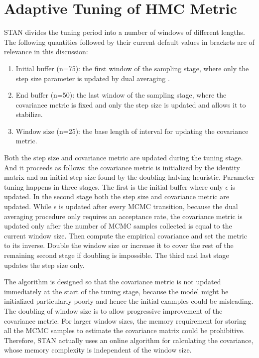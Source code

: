 \documentclass[]{report}
\begin{document}
\section{Adaptive Tuning of HMC Metric}
STAN divides the tuning period into a number of windows of different lengths. The following quantities followed by their current default values in brackets are of relevance in this discussion: 

\begin{enumerate}
\item Initial buffer (n=75): the first window of the sampling stage, where only the step size parameter is updated by dual averaging .

\item End buffer (n=50): the last window of the sampling stage, where the covariance metric is fixed and only the step size is updated and allows it to stabilize.

\item Window size (n=25): the base length of interval for updating the covariance metric. 
\end{enumerate}

Both the step size and covariance metric are updated during the tuning stage. And it proceeds as follows: the covariance metric is initialized by the identity matrix and an initial step size found by the doubling-halving heuristic. Parameter tuning happens in three stages. The first is the initial buffer where only $\epsilon $ is updated. In the second stage both the step size and covariance metric are updated. While $\epsilon$ is updated after every MCMC transition, because the dual averaging procedure only requires an acceptance rate, the covariance metric is updated only after the number of MCMC samples collected is equal to the current window size. Then compute the empirical covariance and set the metric to its inverse. Double the window size or increase it to cover the rest of the remaining second stage if doubling is impossible. The third and last stage updates the step size only. 

The algorithm is designed so that the covariance metric is not updated immediately at the start of the tuning stage, because the model might be initialized particularly poorly and hence the initial examples could be misleading. The doubling of window size is to allow progressive improvement of the covariance metric. For larger window sizes, the memory requirement for storing all the MCMC samples to estimate the covariance matrix could be prohibitive. Therefore, STAN actually uses an online algorithm for calculating the covariance, whose memory complexity is independent of the window size. 
\end{document}
